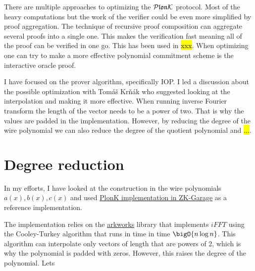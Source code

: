 There are multiple approaches to optimizing the $\mathcal{P}\mathfrak{lon}\mathcal{K}$ protocol. Most of the heavy computations but the work of the verifier could be even more simplified by proof aggregation. The technique of recursive proof composition can aggregate several proofs into a single one. This makes the verification fast meaning all of the proof can be verified in one go. This has been used in \hl{xxx}. When optimizing one can try to make a more effective polynomial commitment scheme is the interactive oracle proof.

I have focused on the prover algorithm, specifically IOP. I led a discussion about the possible optimization with Tomáš Krňák who suggested looking at the interpolation and making it more effective. When running inverse Fourier transform the length of the vector needs to be a power of two. That is why the values are padded in the implementation. However, by reducing the degree of the wire polynomial we can also reduce the degree of the quotient polynomial and \hl{...}. 

\section{Degree reduction}
In my efforts, I have looked at the construction in the wire polynomials $a(x), b(x), c(x)$ and used \href{https://github.com/ZK-Garage/plonk}{PlonK implementation in ZK-Garage} as a reference implementation.

The implementation relies on the \href{https://github.com/arkworks-rs}{arkworks} library that implements $iFFT$ using the Cooley-Turkey algorithm that runs in time in time $\bigO{n\log{n}}$. This algorithm can interpolate only vectors of length that are powers of 2, which is why the polynomial is padded with zeros. However, this raises the degree of the polynomial. Lets 



